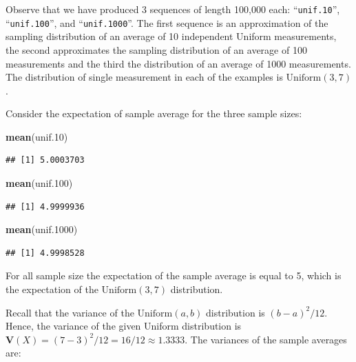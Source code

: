 \documentclass[]{krantz}
\makeatletter
\newenvironment{Shaded}{\begin{snugshade}}{\end{snugshade}}
\newcommand{\FloatTok}[1]{\textcolor[rgb]{0.00,0.00,0.81}{#1}}
\newcommand{\KeywordTok}[1]{\textcolor[rgb]{0.13,0.29,0.53}{\textbf{#1}}}
\newcommand{\NormalTok}[1]{#1}
\newcommand{\Var}{\mathbf{V}}
\newenvironment{kframe}{%
\medskip{}
\setlength{\fboxsep}{.8em}
 \def\at@end@of@kframe{}%
 \ifinner\ifhmode%
  \def\at@end@of@kframe{\end{minipage}}%
  \begin{minipage}{\columnwidth}%
 \fi\fi%
 \def\FrameCommand##1{\hskip\@totalleftmargin \hskip-\fboxsep
 \colorbox{shadecolor}{##1}\hskip-\fboxsep
     \hskip-\linewidth \hskip-\@totalleftmargin \hskip\columnwidth}%
 \MakeFramed {\advance\hsize-\width
   \@totalleftmargin\z@ \linewidth\hsize
   \@setminipage}}%
 {\par\unskip\endMakeFramed%
 \at@end@of@kframe}
\renewenvironment{Shaded}{\begin{kframe}}{\end{kframe}}
\theoremstyle{definition}
\theoremstyle{definition}
\theoremstyle{definition}
\theoremstyle{remark}
\makeatother
\begin{document}
Observe that we have produced 3 sequences of length 100,000 each:
``\texttt{unif.10}'', ``\texttt{unif.100}'', and ``\texttt{unif.1000}''. The first sequence is an
approximation of the sampling distribution of an average of 10
independent Uniform measurements, the second approximates the sampling
distribution of an average of 100 measurements and the third the
distribution of an average of 1000 measurements. The distribution of
single measurement in each of the examples is \(\mathrm{Uniform}(3,7)\).

Consider the expectation of sample average for the three sample sizes:

\begin{Shaded}
\begin{Highlighting}[]
\KeywordTok{mean}\NormalTok{(unif}\FloatTok{.10}\NormalTok{)}
\end{Highlighting}
\end{Shaded}

\begin{verbatim}
## [1] 5.0003703
\end{verbatim}

\begin{Shaded}
\begin{Highlighting}[]
\KeywordTok{mean}\NormalTok{(unif}\FloatTok{.100}\NormalTok{)}
\end{Highlighting}
\end{Shaded}

\begin{verbatim}
## [1] 4.9999936
\end{verbatim}

\begin{Shaded}
\begin{Highlighting}[]
\KeywordTok{mean}\NormalTok{(unif}\FloatTok{.1000}\NormalTok{)}
\end{Highlighting}
\end{Shaded}

\begin{verbatim}
## [1] 4.9998528
\end{verbatim}

For all sample size the expectation of the sample average is equal to 5,
which is the expectation of the \(\mathrm{Uniform}(3,7)\) distribution.

Recall that the variance of the \(\mathrm{Uniform}(a,b)\) distribution is
\((b-a)^2/12\). Hence, the variance of the given Uniform distribution is
\(\Var(X) = (7-3)^2/12 = 16/12 \approx 1.3333\). The variances of the
sample averages are:
\end{document}

